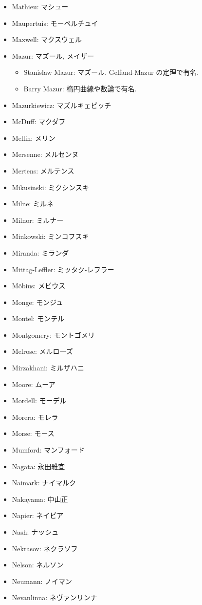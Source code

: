 \documentclass[openany, a4paper, oneside]{jsbook}
\begin{document}
\begin{itemize}
\item Mathieu: マシュー
\item Maupertuis: モーペルチュイ
\item Maxwell: マクスウェル
\item Mazur: マズール, メイザー
\begin{itemize}
\item Stanislaw Mazur: マズール. Gelfand-Mazur の定理で有名.
\item Barry Mazur: 楕円曲線や数論で有名.
\end{itemize}
\item Mazurkiewicz: マズルキェビッチ
\item McDuff: マクダフ
\item Mellin: メリン
\item Mersenne: メルセンヌ
\item Mertens: メルテンス
\item Mikusinski: ミクシンスキ
\item Milne: ミルネ
\item Milnor: ミルナー
\item Minkowski: ミンコフスキ
\item Miranda: ミランダ
\item Mittag-Leffler: ミッタク-レフラー
\item M\"obius: メビウス
\item Monge: モンジュ
\item Montel: モンテル
\item Montgomery: モントゴメリ
\item Melrose: メルローズ
\item Mirzakhani: ミルザハニ
\item Moore: ムーア
\item Mordell: モーデル
\item Morera: モレラ
\item Morse: モース
\item Mumford: マンフォード
\item Nagata: 永田雅宜
\item Naimark: ナイマルク
\item Nakayama: 中山正
\item Napier: ネイピア
\item Nash: ナッシュ
\item Nekrasov: ネクラソフ
\item Nelson: ネルソン
\item Neumann: ノイマン
\item Nevanlinna: ネヴァンリンナ

\end{itemize}
\end{document}
